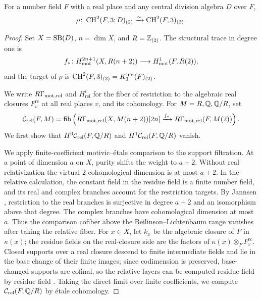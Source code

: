 \begin{proposition}\label{prop:global-real-weight-two}
For a number field $F$ with a real place and any central division algebra $D$ over $F$,
\[
 \rho\colon\operatorname{CH}^2(F,3;D)_{(2)}\xrightarrow{\sim}\operatorname{CH}^2(F,3)_{(2)}.
\]
\end{proposition}
\begin{proof}
Set $X=\operatorname{SB}(D)$, $n=\dim X$, and $R=\mathbb Z_{(2)}$.
The structural trace in degree one is
\[
 f_*\colon H^{2n+1}_{\mathrm{mot}}(X,R(n+2))\longrightarrow H^1_{\mathrm{mot}}(F,R(2)),
\]
and the target of $\rho$ is $\operatorname{CH}^2(F,3)_{(2)}=K_3^{\mathrm{ind}}(F)_{(2)}$.

We write $R\Gamma_{\mathrm{mot},\mathrm{rel}}$ and $H^i_{\mathrm{rel}}$ for the fiber of restriction to the algebraic real closures $F_v^{\mathrm{rc}}$ at all real places $v$, and its cohomology.
For $M=R,\mathbb Q,\mathbb Q/R$, set
\[
 \mathcal C_{\mathrm{rel}}(F,M)=\operatorname{fib}\left(
 R\Gamma_{\mathrm{mot},\mathrm{rel}}(X,M(n+2))[2n]
 \xrightarrow{f_*} R\Gamma_{\mathrm{mot},\mathrm{rel}}(F,M(2))
 \right).
\]
We first show that $H^0\mathcal C_{\mathrm{rel}}(F,\mathbb Q/R)$ and $H^1\mathcal C_{\mathrm{rel}}(F,\mathbb Q/R)$ vanish.

We apply finite-coefficient motivic--\'etale comparison to the support filtration.
At a point of dimension $a$ on $X$, purity shifts the weight to $a+2$.
Without real relativization the virtual $2$-cohomological dimension is at most $a+2$.
In the relative calculation, the constant field in the residue field is a finite number field, and its real and complex branches account for the restriction targets.
By Jannsen \cite[Proposition 1.2 and Lemma 1.3]{Jannsen}, restriction to the real branches is surjective in degree $a+2$ and an isomorphism above that degree.
The complex branches have cohomological dimension at most $a$.
Thus the comparison cofiber above the Beilinson--Lichtenbaum range \cite{Voevodsky} vanishes after taking the relative fiber.
For $x\in X$, let $k_x$ be the algebraic closure of $F$ in $\kappa(x)$; the residue fields on the real-closure side are the factors of $\kappa(x)\otimes_FF_v^{\mathrm{rc}}$.
Closed supports over a real closure descend to finite intermediate fields and lie in the base change of their finite images; since codimension is preserved, base-changed supports are cofinal, so the relative layers can be computed residue field by residue field \cite[Proposition 1.2, Lemma 1.3(b), Remark 1.4(a)]{Jannsen}.
Taking the direct limit over finite coefficients, we compute $\mathcal C_{\mathrm{rel}}(F,\mathbb Q/R)$ by \'etale cohomology.


\end{proof}
